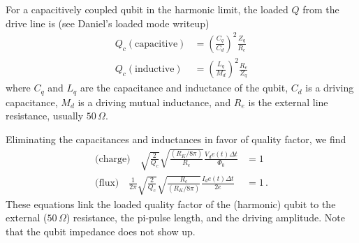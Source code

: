 
For a capacitively coupled qubit in the harmonic limit, the loaded $Q$ from the drive line is (see Daniel's loaded mode writeup)
\begin{align*}
  Q_c (\text{capacitive}) &= \left( \frac{C_q}{C_d} \right)^2 \frac{Z_q}{R_e} \\
  Q_c (\text{inductive}) &= \left( \frac{L_q}{M_d} \right)^2 \frac{R_e}{Z_q}
\end{align*}
where $C_q$ and $L_q$ are the capacitance and inductance of the qubit, $C_d$ is a driving capacitance, $M_d$ is a driving mutual inductance, and $R_e$ is the external line resistance, usually $50 \, \Omega$.

Eliminating the capacitances and inductances in favor of quality factor, we find
\begin{align*}
  \text{(charge)} \quad
    \sqrt{\frac{2}{Q_c}}
    \sqrt{\frac{(R_K/8\pi)}{R_e}} \frac{V_d e(t) \Delta t}{\Phi_0} &= 1 \\
  \text{(flux)} \quad
    \frac{1}{2\pi} \sqrt{\frac{2}{Q_c}}
    \sqrt{\frac{R_e}{(R_K/8\pi)}} \frac{I_d e(t) \Delta t}{2e} &= 1 \, .
\end{align*}
These equations link the loaded quality factor of the (harmonic) qubit to the external ($50 \, \Omega$) resistance, the pi-pulse length, and the driving amplitude.
Note that the qubit impedance does not show up.
